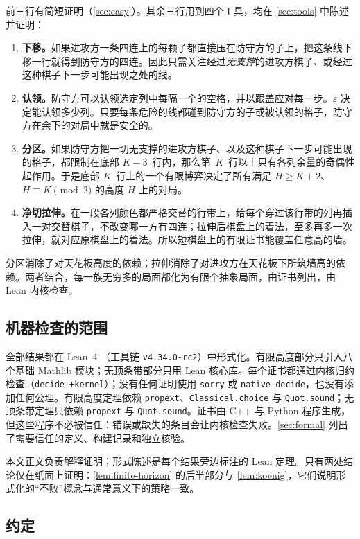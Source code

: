 \documentclass[11pt,a4paper]{article}
\theoremstyle{zhthm}
\newcommand{\code}[1]{{\upshape\texttt{\small\nolinkurl{#1}}}}
\newcommand{\eps}{\varepsilon}
\begin{document}
前三行有简短证明（\cref{sec:easy}）。其余三行用到四个工具，均在 \cref{sec:tools} 中陈述并证明：

\begin{enumerate}
  \item \textbf{下移。}如果进攻方一条四连上的每颗子都直接压在防守方的子上，把这条线下移一行就得到防守方的四连。因此只需关注经过\emph{无支撑}的进攻方棋子、或经过这种棋子下一步可能出现之处的线。
  \item \textbf{认领。}防守方可以认领选定列中每隔一个的空格，并以跟盖应对每一步。$\eps$ 决定能认领多少列。只要每条危险的线都碰到防守方的子或被认领的格子，防守方在余下的对局中就是安全的。
  \item \textbf{分区。}如果防守方把一切无支撑的进攻方棋子、以及这种棋子下一步可能出现的格子，都限制在底部 $K-3$~行内，那么第~$K$~行以上只有各列余量的奇偶性起作用。于是底部 $K$~行上的一个有限博弈决定了所有满足 $H\ge K+2$、$H\equiv K \pmod 2$ 的高度 $H$ 上的对局。
  \item \textbf{净切拉伸。}在一段各列颜色都严格交替的行带上，给每个穿过该行带的列再插入一对交替棋子，不改变哪一方有四连；拉伸后棋盘上的着法，至多再多一次拉伸，就对应原棋盘上的着法。所以短棋盘上的有限证书能覆盖任意高的墙。
\end{enumerate}

分区消除了对天花板高度的依赖；拉伸消除了对进攻方在天花板下所筑墙高的依赖。两者结合，每一族无穷多的局面都化为有限个抽象局面，由证书列出，由 Lean 内核检查。

\subsection{机器检查的范围}

全部结果都在 Lean~4 \cite{lean4}（工具链 \code{v4.34.0-rc2}）中形式化。有限高度部分只引入八个基础 Mathlib \cite{mathlib} 模块；无顶条带部分只用 Lean 核心库。每个证书都通过内核归约检查（\code{decide +kernel}）；没有任何证明使用 \code{sorry} 或 \code{native_decide}，也没有添加任何公理。有限高度定理依赖 \code{propext}、\code{Classical.choice} 与 \code{Quot.sound}；无顶条带定理只依赖 \code{propext} 与 \code{Quot.sound}。证书由 C++ 与 Python 程序生成，但这些程序不必被信任：错误或缺失的条目会让内核检查失败。\cref{sec:formal} 列出了需要信任的定义、构建记录和独立核验。

本文正文负责解释证明；形式陈述是每个结果旁边标注的 Lean 定理。只有两处结论仅在纸面上证明：\cref{lem:finite-horizon} 的后半部分与 \cref{lem:koenig}，它们说明形式化的“不败”概念与通常意义下的策略一致。

\subsection{约定}
\label{sec:conventions}
\end{document}
